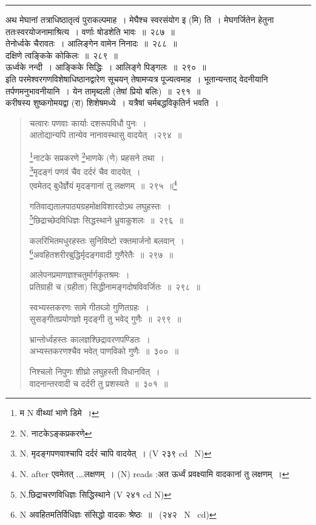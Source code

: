 \documentclass[11pt, openany]{book}
\begin{document}
\hrule
 
\vspace{2mm}
अथ मेघानां तत्राधिष्ठातृत्वं पुराकल्पमाह~। मेघैश्च स्वरसंयोग इ (मि) ति~। मेघगर्जितेन हेतुना ततःस्वरयोजनामाश्रित्य~। वर्णाः षोडशेति भावः~॥~२८७~॥\\

{\qtt तेनोर्ध्वके} चैरावतः~। आलिङ्गेन वामेन निनादः~॥~२८८~॥\\

दक्षिणे त्वङ्किके कोकिलः~॥~२८९~॥\\

ऊर्ध्वके नन्दी~। {\qtt आङ्किके} सिद्धिः~। आलिङ्गे पिङ्गलः~॥~२९०~॥\\

इति परमेश्वरगणविशेषाधिष्ठानद्वारेण सूचयन् तेषामप्यत्र पूज्यत्वमाह~। भूतान्यन्ताद् वेदनीयानि {\qtt तर्पणमनुभावनीयानि}~। येन तामृब्दली (तेषां प्रियो बलिः)~॥~२९१~॥\\

करीषस्य शुष्कगोमयद्वा (रा) शिशेषमध्ये~। यत्रैषां चर्मबद्धविकृतिर्न भवति~। 

\newpage

\begin{quote}
{\na  चत्वारः पणवाः कार्याः दशरूपविधौ पुनः~।\\
 आतोद्यान्यपि तान्येव नानावस्थासु वादयेत्~।२९४~॥

 \renewcommand{\thefootnote}{1a}\footnote{म N वीथ्यां भाणे डिमे~।}नाटके सप्रकरणे \renewcommand{\thefootnote}{1}\footnote{N. नाटकेऽङ्कप्रकरणे}भाणके (णे) प्रहसने तथा~।\\
 \renewcommand{\thefootnote}{2}\footnote{N. मृदङ्गपणवाश्चापि दर्दरं चापि वादयेत्~। (V २३९ cd \textendash\  N)}मृदङ्गं पणवं चैव दर्दरं चैव वादयेत्~।\\
 एवमेतद् बुधैर्ज्ञेयं मृदङ्गानां तु लक्षणम्~॥~२९५~॥\renewcommand{\thefootnote}{3}\footnote{N. after एवमेतत् .\ldots लक्षणम्~। (N) reads :अत ऊर्ध्वं प्रवक्ष्यामि वादकानां तु लक्षणम्~।}

 गतिवाद्यतालपाठ्यग्रहमोक्षविशारदोऽथ लघुहस्तः~।\\
 \renewcommand{\thefootnote}{4}\footnote{N.छिद्राचरणविधिज्ञः सिद्धिस्थाने (V २४१ cd N)}छिद्राच्छेदविधिज्ञः सिद्धस्थाने ध्रुवाकुशलः~॥~२९६~॥

 कलरिभितमधुरहस्तः सुनिविष्टो रक्तमार्जनो बलवान्~।\\
 \renewcommand{\thefootnote}{5}\footnote{N अवहितमतिर्विधिज्ञः संसिद्धो वादकः श्रेष्ठः~॥~ (२४२  \textendash\ N \textendash\ cd)}अवहितशरीरबुद्धिर्मृदङ्गवादी गुणैरेतैः~॥~२९७~॥

 आलेपनप्रमाणज्ञश्चतुर्मार्गकृतश्रमः~।\\
 प्रतिग्राही च (ग्रहीता) सिद्धीनामङ्गदोषविवर्जितः~॥~२९८~॥

 स्वभ्यस्तकरणः सामे गीतब्ञो गुणितग्रहः~।\\
 सुसङ्गीतप्रयोगज्ञो मृदङ्गी तु भवेद् गुणैः~॥~२९९~॥

 भ्रान्तोर्ध्वहस्तः कालज्ञश्छिद्रावरणपण्डितः~।\\
 अभ्यस्तकरणश्चैव भवेत् पाणविको गुणैः~॥~३००~॥

 निश्चलो निपुणः शीघ्रो लघुहस्ती विधानवित्~।\\
 वादनान्तरवादी च दर्दरी तु प्रशस्यते~॥~३०१~॥}
\end{quote}
\end{document}
